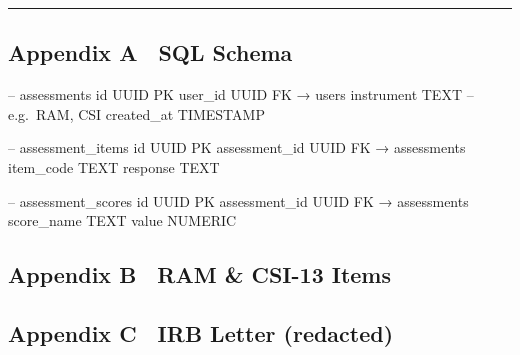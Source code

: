 \documentclass[
]{article}
\begin{document}
\begin{center}\rule{0.5\linewidth}{0.5pt}\end{center}

\subsection{Appendix A SQL Schema}\label{appendix-a-sql-schema}

-- assessments id UUID PK user\_id UUID FK → users instrument TEXT --
e.g.~RAM, CSI created\_at TIMESTAMP

-- assessment\_items id UUID PK assessment\_id UUID FK → assessments
item\_code TEXT response TEXT

-- assessment\_scores id UUID PK assessment\_id UUID FK → assessments
score\_name TEXT value NUMERIC

\subsection{Appendix B RAM \& CSI-13
Items}\label{appendix-b-ram-csi-13-items}


\subsection{Appendix C IRB Letter
(redacted)}\label{appendix-c-irb-letter-redacted}

\end{document}
